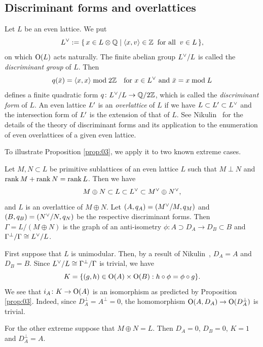 \documentclass{amsart}
\numberwithin{procedure}{section}
\begin{document}
\subsection{Discriminant forms and overlattices}\label{subsec:disc}
%
Let $L$ be an even lattice.
We put
\[
L\sp{\vee}:=\{\,{x\in L\otimes\mathord{\mathbb Q}}\mid {\langle x, v \rangle\in \mathord{\mathbb Z}\;\;\textrm{for all}\;\; v\in L} \,\},
\]
on which $\mathord{\mathrm{O}}(L)$ acts naturally.
The finite abelian group $L\sp{\vee} /L$ is called
the \emph{discriminant group} of $L$.
Then 
\[
q(\bar{x})=\langle x, x \rangle\bmod 2\mathord{\mathbb Z}
\quad \textrm{for $x\in L\sp{\vee}$ and $\bar{x}=x \bmod L$}
\]
defines a finite quadratic form $q\colon L\sp{\vee}/L \to \mathord{\mathbb Q}/2\mathord{\mathbb Z}$,
which is called 
the \emph{discriminant form} of $L$.
An even lattice $L\sp\prime$ is an \emph{overlattice} of $L$
if  we have $L\subset L\sp\prime\subset L\sp{\vee}$
and the intersection form of $L\sp\prime$ is
the extension of that of $L$.
See Nikulin~\cite{Nikulin79}
for the details of the theory of discriminant forms
and its application to the enumeration of
even overlattices of a given even lattice.
\par
To illustrate Proposition \ref{prop:03}, we apply it to two known extreme cases.
%
\begin{example}
 Let $M,N \subset L$ be primitive sublattices of an even lattice $L$
 such that $M\perp N$ %
 and $\operatorname{\mathrm{rank}}\nolimits M+\operatorname{\mathrm{rank}}\nolimits N=\operatorname{\mathrm{rank}}\nolimits L$. Then we have
 \[M \oplus N \subset L \subset L\sp{\vee}  \subset M\sp{\vee}  \oplus N\sp{\vee} , \]
 and $L$
 is an overlattice of $M\oplus N$.
 Let $(A,q_A)= (M\sp{\vee} /M,q_M)$ and $(B,q_B)= (N\sp{\vee} /N,q_N)$
 be the respective discriminant forms.
 Then $\Gamma = L/(M \oplus N)$ is the graph of an anti-isometry
 $\phi\colon A \supset D_A \rightarrow D_B \subset B$ and $\Gamma^\perp/\Gamma \cong L\sp{\vee} /L$.
 \par
 First suppose that $L$ is unimodular. Then,
 by a result of Nikulin~\cite{Nikulin79}, $D_A = A$ and $D_B=B$. 
 Since $L\sp{\vee} /L \cong \Gamma^\perp/\Gamma$ is trivial,
 we have 
 \[
 K=\{(g,h) \in \mathord{\mathrm{O}}(A) \times  \mathord{\mathrm{O}}(B) : h \circ \phi = \phi \circ g \}.
 \]
 We see that $i_A\colon K \rightarrow  \mathord{\mathrm{O}}(A)$ is an isomorphism
 as predicted by Proposition \ref{prop:03}.
 Indeed, since $D_A^\perp = A^\perp =0$, the homomorphism $ \mathord{\mathrm{O}}(A,D_A) \rightarrow  \mathord{\mathrm{O}}(D_A^\perp)$ is trivial.
 \par
 For the other extreme suppose that $M\oplus N = L$. Then $D_A = 0$, $D_B=0$, $K = 1$ and $D_A^\perp = A$.
 \end{example}
%
%
\end{document}
